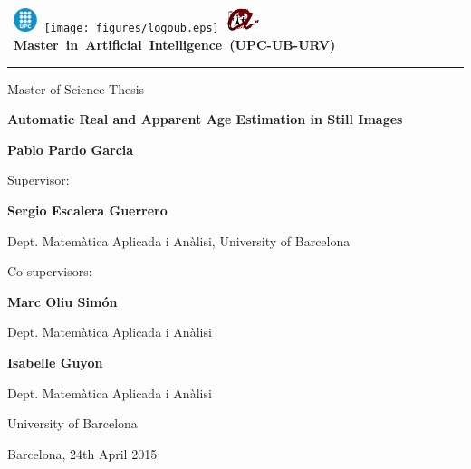 \thispagestyle{empty}
\vspace*{-2cm}

\hbox{
\includegraphics[width=0.7cm]{figures/logoupc.eps}
\texttt{[image: figures/logoub.eps]}
\includegraphics[width=1cm]{figures/logourv.eps}
\Large \bf Master in Artificial Intelligence (UPC-UB-URV)}
\hrule

\bigskip\bigskip\bigskip

\begin{center}

{\LARGE Master of Science Thesis}

\bigskip\bigskip\bigskip\bigskip\bigskip

\textbf{\huge \bf Automatic Real and Apparent Age Estimation in Still Images}

\bigskip\bigskip\bigskip\bigskip\bigskip

{\LARGE \bf Pablo Pardo Garcia}

\end{center}
\vspace*{3cm}

{\large Supervisor:}

\medskip\medskip\smallskip

{\Large\bf Sergio Escalera Guerrero}

\medskip\medskip

{\Large Dept. Matemàtica Aplicada i Anàlisi, University of Barcelona}




\bigskip\bigskip\bigskip

{\large Co-supervisors:}

\medskip\medskip\smallskip

{\Large\bf Marc Oliu Simón}

\medskip\medskip

{\Large Dept. Matemàtica Aplicada i Anàlisi}

\medskip\medskip\smallskip

{\Large\bf Isabelle Guyon}

\medskip\medskip

{\Large Dept. Matemàtica Aplicada i Anàlisi}

\medskip

{\Large University of Barcelona}

\medskip\medskip\medskip\medskip\medskip

{\Large Barcelona, 24th April 2015}



